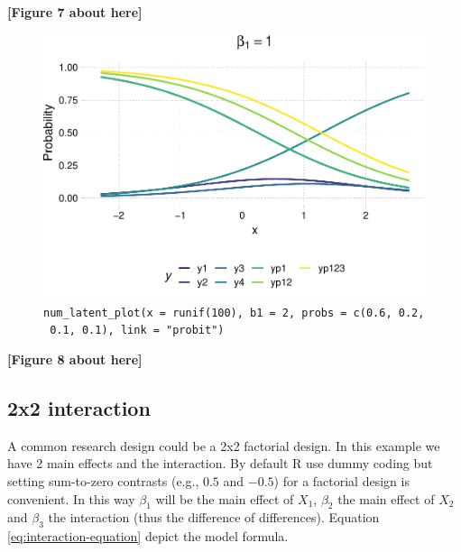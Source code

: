 \documentclass[
  man,floatsintext]{apa6}
\begin{document}
\begin{center}\textbf{[Figure 7 about here]} \end{center}

\normalsize

\scriptsize

\begin{figure}

{\centering \includegraphics{paper_files/figure-latex/fig-example-num-latent-1} 

}

\caption{\texttt{num\_latent\_plot(x\ =\ runif(100),\ b1\ =\ 2,\ probs\ =\ c(0.6,\ 0.2,\ 0.1,\ 0.1),\ link\ =\ "probit")}}\label{fig:fig-example-num-latent}
\end{figure}

\begin{center}\textbf{[Figure 8 about here]} \end{center}

\normalsize

\subsection{2x2 interaction}\label{x2-interaction}

A common research design could be a 2x2 factorial design. In this example we have 2 main effects and the interaction. By default R use dummy coding but setting sum-to-zero contrasts (e.g., \(0.5\) and \(-0.5\)) for a factorial design is convenient. In this way \(\beta_1\) will be the main effect of \(X_1\), \(\beta_2\) the main effect of \(X_2\) and \(\beta_3\) the interaction (thus the difference of differences). Equation \eqref{eq:interaction-equation} depict the model formula.
\end{document}
